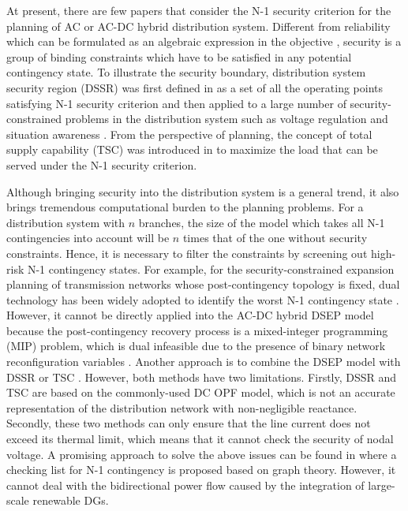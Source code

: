 \documentclass[a4paper,fleqn]{cas-dc}
\begin{document}
At present, there are few papers that consider the N-1 security criterion for 
the planning of AC or AC-DC hybrid distribution system. Different from 
reliability which can be formulated as an algebraic expression in the objective 
\cite{Muñoz-Delgado_2018_Reliability}, security is a group of binding 
constraints which have to be satisfied in any potential contingency state. To 
illustrate the security boundary, distribution system security region (DSSR) was 
first defined in \cite{Xiao_2017_Observation} as a set of all the operating 
points satisfying N-1 security criterion and then applied to a large number of 
security-constrained problems in the distribution system such as voltage 
regulation \cite{Yang_2018_Static} and situation awareness 
\cite{Xiao_2019_Distribution}. From the perspective of planning, the concept of 
total supply capability (TSC) was introduced in \cite{Chen_2016_Method} to 
maximize the load that can be served under the N-1 security criterion.

Although bringing security into the distribution system is a general 
trend, it also brings tremendous computational burden to the planning problems.
For a distribution system with $ n $ branches, the size of the model which 
takes all N-1 contingencies into account will be $ n $ times that of the 
one without security constraints. Hence, it is necessary to filter the 
constraints by screening out high-risk N-1 contingency states. For example, for
the security-constrained expansion planning of transmission networks whose 
post-contingency topology is fixed, dual technology has been widely adopted 
to identify the worst N-1 contingency state \cite{Wu_2016_Two-stage}. However, 
it cannot be directly applied into the AC-DC hybrid DSEP model because the 
post-contingency recovery process is a mixed-integer programming (MIP) problem, 
which is dual infeasible due to the presence of binary network reconfiguration
variables \cite{Lin_2019_Combined}. Another approach is to combine the DSEP 
model with DSSR or TSC \cite{Zu_2019_Mathematical, Xiao_2018_TSC-Based}. 
However, both methods have two limitations. Firstly, DSSR and TSC are 
based on the commonly-used DC OPF model, which is not an accurate 
representation of the distribution network with non-negligible reactance. 
Secondly, these two methods can only ensure that the line current does not 
exceed its thermal limit, which means that it cannot check the security of 
nodal voltage. A promising approach to solve the above issues can be found in
\cite{Lin_2019_Distribution} where a checking list for N-1 contingency is 
proposed based on graph theory. However, it cannot deal with the bidirectional 
power flow caused by the integration of large-scale renewable DGs.
\end{document}
